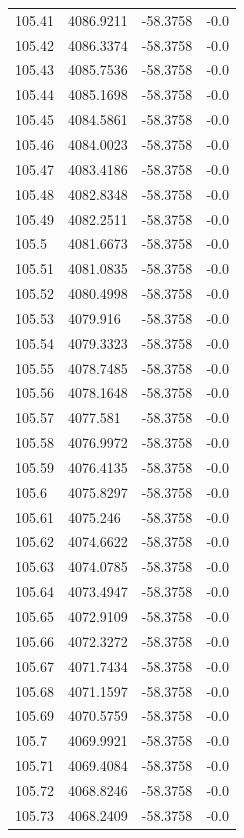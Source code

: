 \begin{table}[H]
\begin{tabular}{llll}
105.41 & 4086.9211 & -58.3758 & -0.0 \\
105.42 & 4086.3374 & -58.3758 & -0.0 \\
105.43 & 4085.7536 & -58.3758 & -0.0 \\
105.44 & 4085.1698 & -58.3758 & -0.0 \\
105.45 & 4084.5861 & -58.3758 & -0.0 \\
105.46 & 4084.0023 & -58.3758 & -0.0 \\
105.47 & 4083.4186 & -58.3758 & -0.0 \\
105.48 & 4082.8348 & -58.3758 & -0.0 \\
105.49 & 4082.2511 & -58.3758 & -0.0 \\
105.5 & 4081.6673 & -58.3758 & -0.0 \\
105.51 & 4081.0835 & -58.3758 & -0.0 \\
105.52 & 4080.4998 & -58.3758 & -0.0 \\
105.53 & 4079.916 & -58.3758 & -0.0 \\
105.54 & 4079.3323 & -58.3758 & -0.0 \\
105.55 & 4078.7485 & -58.3758 & -0.0 \\
105.56 & 4078.1648 & -58.3758 & -0.0 \\
105.57 & 4077.581 & -58.3758 & -0.0 \\
105.58 & 4076.9972 & -58.3758 & -0.0 \\
105.59 & 4076.4135 & -58.3758 & -0.0 \\
105.6 & 4075.8297 & -58.3758 & -0.0 \\
105.61 & 4075.246 & -58.3758 & -0.0 \\
105.62 & 4074.6622 & -58.3758 & -0.0 \\
105.63 & 4074.0785 & -58.3758 & -0.0 \\
105.64 & 4073.4947 & -58.3758 & -0.0 \\
105.65 & 4072.9109 & -58.3758 & -0.0 \\
105.66 & 4072.3272 & -58.3758 & -0.0 \\
105.67 & 4071.7434 & -58.3758 & -0.0 \\
105.68 & 4071.1597 & -58.3758 & -0.0 \\
105.69 & 4070.5759 & -58.3758 & -0.0 \\
105.7 & 4069.9921 & -58.3758 & -0.0 \\
105.71 & 4069.4084 & -58.3758 & -0.0 \\
105.72 & 4068.8246 & -58.3758 & -0.0 \\
105.73 & 4068.2409 & -58.3758 & -0.0 \\

\end{tabular}
\end{table}
